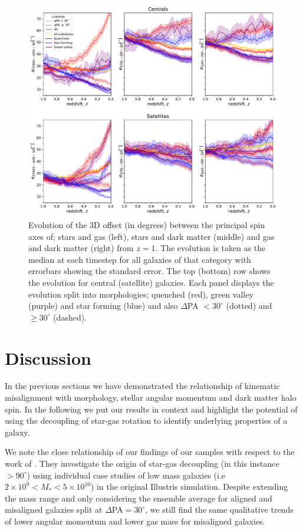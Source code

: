 \documentclass[fleqn,usenatbib]{mnras}
\begin{document}
\begin{figure}
	\includegraphics[width=\linewidth]{tng_results/3D_pa_evo_cen_sat.pdf}
    \caption{Evolution of the 3D offset (in degrees) between the principal spin axes of; stars and gas (left), stars and dark matter (middle) and gas and dark matter (right) from $z=1$. The evolution is taken as the median at each timestep for all galaxies of that category with errorbars showing the standard error. The top (bottom) row shows the evolution for central (satellite) galaxies. Each panel displays the evolution split into morphologies; quenched (red), green valley (purple) and star forming (blue) and also $\Delta$PA $< 30^{\circ}$ (dotted) and $\geq 30^{\circ}$ (dashed).}
    \label{fig:3D_alpha_evo}
\end{figure}

\section{Discussion} \label{sec:discussion}
In the previous sections we have demonstrated the relationship of kinematic misalignment with morphology, stellar angular momentum and dark matter halo spin. In the following we put our results in context and highlight the potential of using the decoupling of star-gas rotation to identify underlying properties of a galaxy. 

We note the close relationship of our findings of our samples with respect to the work of \citet{starkenburg+19}. They investigate the origin of star-gas decoupling (in this instance $ > 90^{\circ}$) using individual case studies of low mass galaxies (i.e $2 \times 10^{9} < M_{\ast} < 5 \times 10^{10}$) in the original Illustris simulation. Despite extending the mass range and only considering the ensemble average for aligned and misaligned galaxies split at $\Delta$PA$= 30^{\circ}$, we still find the same qualitative trends of lower angular momentum and lower gas mass for misaligned galaxies. 
\end{document}
